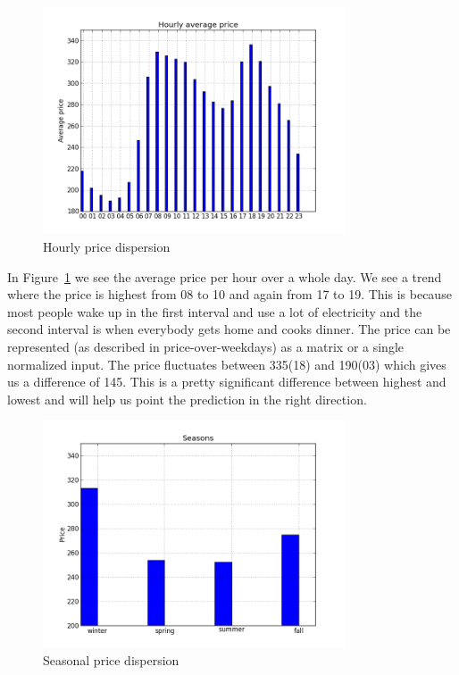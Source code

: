 \begin{figure}[H]
\centering
\includegraphics[width=0.8\textwidth ,natwidth=410,natheight=237]{billeder/energy_price_plots/price_per_hour.png}
\caption{Hourly price dispersion}
\label{fig:price_per_hour}
\end{figure}

In Figure~\ref{fig:price_per_hour} we see the average price per hour over a whole day. We see a trend where the price is highest from 08 to 10 and again from 17 to 19. This is because most people wake up in the first interval and use a lot of electricity and the second interval is when everybody gets home and cooks dinner. The price can be represented (as described in price-over-weekdays) as a matrix or a single normalized input. The price fluctuates between 335(18) and 190(03) which gives us a difference of 145. This is a pretty significant difference between highest and lowest and will help us point the prediction in the right direction.

\begin{figure}[H]
\centering
\includegraphics[width=0.8\textwidth ,natwidth=410,natheight=237]{billeder/energy_price_plots/seasons.png}
\caption{Seasonal price dispersion}
\label{fig:seasons}
\end{figure}

